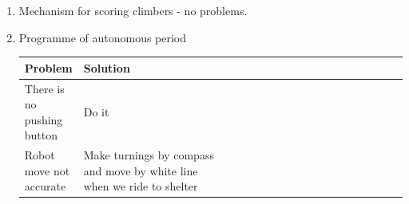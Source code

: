\begin{enumerate}
		\item Mechanism for scoring climbers - no problems.
		\item Programme of autonomous period
		\begin{table}[H]
			\vspace{-2mm}
			\begin{center}
				\begin{tabular}{|p{0.15\linewidth}|p{0.4\linewidth}|p{0.55\linewidth}}
					\hline
					Problem & Solution\\
					\hline
					There is no pushing button  & Do it  \\	
					\hline
					Robot move not accurate & Make turnings by compass and move by white line when we ride to shelter  \\	
					\hline
				\end{tabular}
			\end{center}
		\end{table}
	\end{enumerate}
